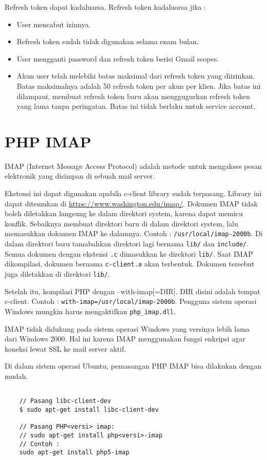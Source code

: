 Refresh token dapat kadaluarsa. Refresh token kadaluarsa jika :
\begin{itemize}
\item User mencabut izinnya.
\item Refresh token sudah tidak digunakan selama enam bulan.
\item User mengganti password dan refresh token berisi Gmail scopes.
\item Akun user telah melebihi batas maksimal dari refresh token yang diizinkan. Batas maksimalnya adalah 50 refresh token per akun per klien. Jika batas ini dilampaui, membuat refresh token baru akan menggugurkan refresh token yang lama tanpa peringatan. Batas ini tidak berlaku untuk service account.
\end{itemize}
\section{PHP IMAP ~\cite{php-imap}}
\label{sec:PHPIMAP}
IMAP (Internet Message Access Protocol) adalah metode untuk mengakses pesan elektronik yang disimpan di sebuah mail server.

Ekstensi ini dapat digunakan apabila c-client library sudah terpasang. Library ini dapat ditemukan di \url{https://www.washington.edu/imap/}. Dokumen IMAP tidak boleh diletakkan langsung ke dalam direktori system, karena dapat memicu konflik. Sebaiknya membuat direktori baru di dalam direktori system, lalu memasukkan dokumen IMAP ke dalamnya. Contoh : \texttt{/usr/local/imap-2000b}. Di dalam direktori baru tamabahkan direktori lagi bernama \texttt{lib/} dan \texttt{include/}. Semua dokumen dengan ekstensi \texttt{.c} dimasukkan ke direktori \texttt{lib/}. Saat IMAP dikompilasi, dokumen bernama \texttt{c-client.a} akan terbentuk. Dokumen tersebut juga diletakkan di direktori \texttt{lib/}.

Setelah itu, kompilasi PHP dengan --with-imap[=DIR]. DIR disini adalah tempat c-client. Contoh : \texttt{with-imap=/usr/local/imap-2000b}. Pengguna sistem operasi Windows mungkin harus mengaktifkan \texttt{php\_imap.dll}.

IMAP tidak didukung pada sistem operasi Windows yang versinya lebih lama dari Windows 2000. Hal ini karena IMAP menggunakan fungsi enkripsi agar koneksi lewat SSL ke mail server aktif.

Di dalam sistem operasi Ubuntu, pemasangan PHP IMAP bisa dilakukan dengan mudah.
\begin{lstlisting}
	
	// Pasang libc-client-dev
	$ sudo apt-get install libc-client-dev

	// Pasang PHP<versi> imap:
	// sudo apt-get install php<versi>-imap
	// Contoh : 
	sudo apt-get install php5-imap
		
\end{lstlisting}

